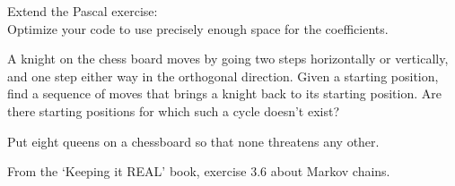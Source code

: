 \begin{exercise}
  \label{ex:pascal-ey}
  Extend the Pascal exercise:\\
  Optimize your code to use
  precisely enough space for the coefficients.
\end{exercise}

\begin{exercise}
  A knight on the chess board moves by going two steps horizontally or
  vertically, and one step either way in the orthogonal
  direction. Given a starting position, find a sequence of moves that
  brings a knight back to its starting position. Are there starting
  positions for which such a cycle doesn't exist?
\end{exercise}

\begin{exercise}
  Put eight queens on a chessboard so that none threatens any other.
\end{exercise}

\begin{exercise}
  From the `Keeping it REAL' book, exercise 3.6 about Markov chains.
\end{exercise}
